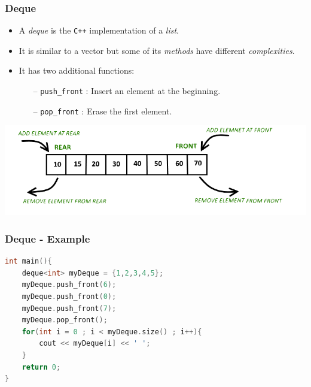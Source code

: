 \documentclass{beamer}
\begin{document}
\begin{frame}
    \frametitle{Deque}
    
    \begin{itemize}
        \item A \textit{deque} is the \texttt{C++} implementation of a \textit{list}.
        \item It is similar to a vector but some of its \textit{methods} have different \textit{complexities}.
        \item It has two additional functions:
            \begin{itemize}
                \item[--] \texttt{push\_front} : Insert an element at the beginning.
                \item[--] \texttt{pop\_front} : Erase the first element.
            \end{itemize}
    \end{itemize}

    \begin{center}
        \includegraphics[scale=0.4]{images/deque}
    \end{center}
\end{frame}

\begin{frame}[fragile]
    \frametitle{Deque - Example}

    \begin{lstlisting}[language=C++]
int main(){
    deque<int> myDeque = {1,2,3,4,5};
    myDeque.push_front(6);
    myDeque.push_front(0);
    myDeque.push_front(7);
    myDeque.pop_front();
    for(int i = 0 ; i < myDeque.size() ; i++){
        cout << myDeque[i] << ' ';
    }
    return 0;
}
    \end{lstlisting}

    \begin{tcolorbox}[title=Output,fontupper=\scriptsize,fonttitle=\scriptsize]
    \end{tcolorbox}
\end{frame}
\end{document}
